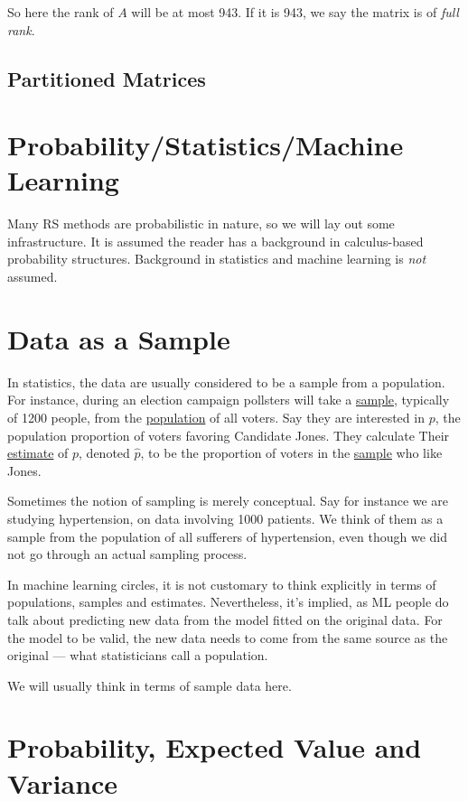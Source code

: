 So
here the rank of $A$ will be at most 943.  If it is 943, we say the
matrix is of \textit{full rank}.

\subsection{Partitioned Matrices}

\section{Probability/Statistics/Machine Learning}

Many RS methods are probabilistic in nature, so we will lay out some
infrastructure.  It is assumed the reader has a background in
calculus-based probability structures.  Background in statistics and
machine learning is \textit{not} assumed.

\section{Data as a Sample}

In statistics, the data are usually considered to be a sample from a
population.  For instance, during an election campaign pollsters will
take a \underline{sample}, typically of 1200 people, from the
\underline{population} of all voters.  Say they are interested in $p$,
the population proportion of voters favoring Candidate Jones. They
calculate Their \underline{estimate} of $p$, denoted $\widehat{p}$, to
be the proportion of voters in the \underline{sample} who like Jones.

Sometimes the notion of sampling is merely conceptual. Say for instance
we are studying hypertension, on data involving 1000 patients.  We think
of them as a sample from the population of all sufferers of
hypertension, even though we did not go through an actual sampling
process.

In machine learning circles, it is not customary to think explicitly in
terms of populations, samples and estimates.  Nevertheless, it's
implied, as ML people do talk about predicting new data from the model
fitted on the original data.  For the model to be valid, the new data
needs to come from the same source as the original --- what
statisticians call a population.

We will usually think in terms of sample data here.

\section{Probability, Expected Value and Variance}

